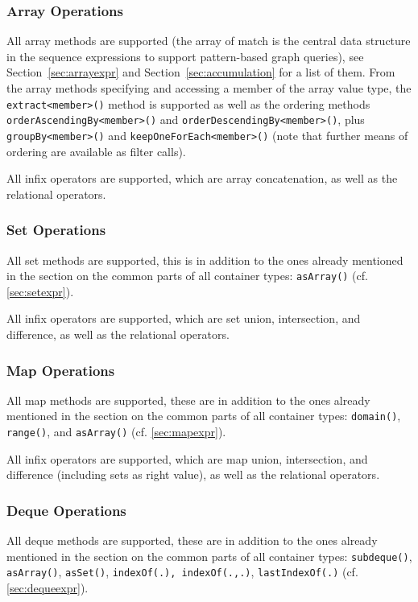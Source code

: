 \subsubsection*{Array Operations}
All array methods are supported (the array of match is the central data structure in the sequence expressions to support pattern-based graph queries), see Section~\ref{sec:arrayexpr} and Section~\ref{sec:accumulation} for a list of them.
From the array methods specifying and accessing a member of the array value type, the \texttt{extract<member>()} method is supported as well as the ordering methods \texttt{order\-Ascending\-By<member>()} and \texttt{order\-Descending\-By<member>()}, plus \texttt{group\-By<member>()} and \texttt{keep\-One\-For\-Each<member>()} (note that further means of ordering are available as filter calls).

All infix operators are supported, which are array concatenation, as well as the relational operators.

\subsubsection*{Set Operations}
All set methods are supported, this is in addition to the ones already mentioned in the section on the common parts of all container types: \texttt{asArray()} (cf. \ref{sec:setexpr}).

All infix operators are supported, which are set union, intersection, and difference, as well as the relational operators.

\subsubsection*{Map Operations}
All map methods are supported, these are in addition to the ones already mentioned in the section on the common parts of all container types: \texttt{domain()}, \texttt{range()}, and \texttt{asArray()} (cf. \ref{sec:mapexpr}).

All infix operators are supported, which are map union, intersection, and difference (including sets as right value), as well as the relational operators.

\subsubsection*{Deque Operations}
All deque methods are supported, these are in addition to the ones already mentioned in the section on the common parts of all container types: \texttt{subdeque()}, \texttt{asArray()}, \texttt{asSet()}, \texttt{indexOf(.), \texttt{indexOf(.,.)}}, \texttt{lastIndexOf(.)} (cf. \ref{sec:dequeexpr}).


